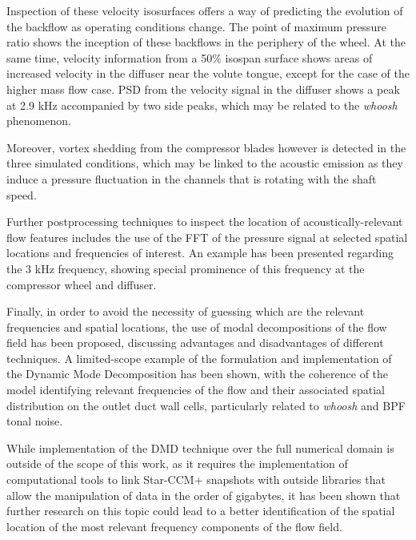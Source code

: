 Inspection of these velocity isosurfaces offers a way of predicting the evolution of the backflow as operating conditions change. The point of maximum pressure ratio shows the inception of these backflows in the periphery of the wheel. At the same time, velocity information from a 50\% isospan surface shows areas of increased velocity in the diffuser near the volute tongue, except for the case of the higher mass flow case. PSD from the velocity signal in the diffuser shows a peak at 2.9 kHz accompanied by two side peaks, which may be related to the \emph{whoosh} phenomenon.

Moreover, vortex shedding from the compressor blades however is detected in the three simulated conditions, which may be linked to the acoustic emission as they induce a pressure fluctuation in the channels that is rotating with the shaft speed.

Further postprocessing techniques to inspect the location of acoustically-relevant flow features includes the use of the FFT of the pressure signal at selected spatial locations and frequencies of interest. An example has been presented regarding the 3 kHz frequency, showing special prominence of this frequency at the compressor wheel and diffuser.

Finally, in order to avoid the necessity of guessing which are the relevant frequencies and spatial locations, the use of modal decompositions of the flow field has been proposed, discussing advantages and disadvantages of different techniques. A limited-scope example of the formulation and implementation of the Dynamic Mode Decomposition has been shown, with the coherence of the model identifying relevant frequencies of the flow and their associated spatial distribution on the outlet duct wall cells, particularly related to \emph{whoosh} and BPF tonal noise.

While implementation of the DMD technique over the full numerical domain is outside of the scope of this work, as it requires the implementation of computational tools to link Star-CCM+ snapshots with outside libraries that allow the manipulation of data in the order of gigabytes, it has been shown that further research on this topic could lead to a better identification of the spatial location of the most relevant frequency components of the flow field.



